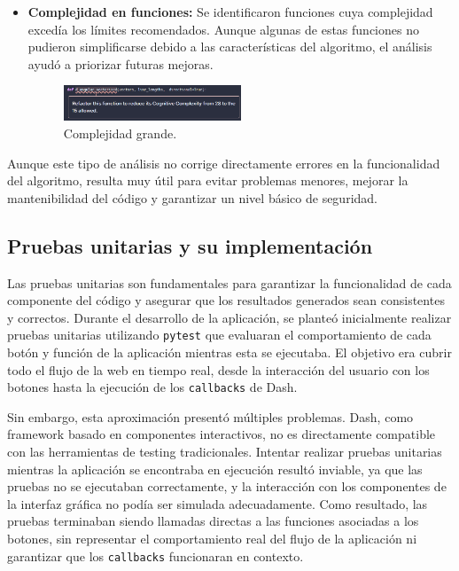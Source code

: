 \begin{itemize}
    \item \textbf{Complejidad en funciones:} Se identificaron funciones cuya complejidad excedía los límites recomendados. Aunque algunas de estas funciones no pudieron simplificarse debido a las características del algoritmo, el análisis ayudó a priorizar futuras mejoras.
    
\begin{figure}[h!]
    \centering
    \includegraphics[width=0.5\textwidth]{img/sonarq_complex.png}
    \caption{Complejidad grande.}
    \label{fig:trayectorias_Spectral}
\end{figure}

\end{itemize}

Aunque este tipo de análisis no corrige directamente errores en la funcionalidad del algoritmo, resulta muy útil para evitar problemas menores, mejorar la mantenibilidad del código y garantizar un nivel básico de seguridad.

\subsection{Pruebas unitarias y su implementación}

Las pruebas unitarias son fundamentales para garantizar la funcionalidad de cada componente del código y asegurar que los resultados generados sean consistentes y correctos. Durante el desarrollo de la aplicación, se planteó inicialmente realizar pruebas unitarias utilizando \texttt{pytest} que evaluaran el comportamiento de cada botón y función de la aplicación mientras esta se ejecutaba. El objetivo era cubrir todo el flujo de la web en tiempo real, desde la interacción del usuario con los botones hasta la ejecución de los \texttt{callbacks} de Dash.

Sin embargo, esta aproximación presentó múltiples problemas. Dash, como framework basado en componentes interactivos, no es directamente compatible con las herramientas de testing tradicionales. Intentar realizar pruebas unitarias mientras la aplicación se encontraba en ejecución resultó inviable, ya que las pruebas no se ejecutaban correctamente, y la interacción con los componentes de la interfaz gráfica no podía ser simulada adecuadamente. Como resultado, las pruebas terminaban siendo llamadas directas a las funciones asociadas a los botones, sin representar el comportamiento real del flujo de la aplicación ni garantizar que los \texttt{callbacks} funcionaran en contexto.


